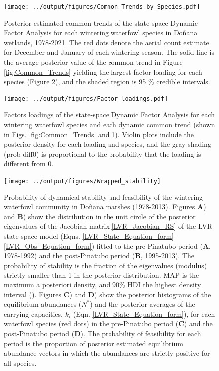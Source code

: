\documentclass[12pt]{article}
\begin{document}
	\begin{figure}[t]
		\centering
		\texttt{[image: ../output/figures/Common\_Trends\_by\_Species.pdf]}
		\caption[Posterior estimated common trends of the state-space DFA]{Posterior estimated common trends of the state-space Dynamic Factor Analysis for each wintering waterfowl species in Doñana wetlands, 1978-2021. The red dots denote the aerial count estimate for December and January of each wintering season. The solid line is the average posterior value of the common trend in Figure \ref{fig:Common_Trends} yielding the largest factor loading for each species (Figure \ref{fig:Factor_loadings}), and the shaded region is 95 \% credible intervals.}
		\label{fig:Common_Trends_by_Species}
	\end{figure}
	
	\begin{figure}[t]
		\centering
		\texttt{[image: ../output/figures/Factor\_loadings.pdf]}
		\caption[Factors loadings of the state-space DFA]{Factors loadings of the state-space Dynamic Factor Analysis for each wintering waterfowl species and each dynamic common trend (shown in Figs. \ref{fig:Common_Trends} and \ref{fig:Common_Trends_by_Species}). Violin plots include the posterior density for each loading and species, and the gray shading (prob diff0) is proportional to the probability that the loading is different from 0.}
		\label{fig:Factor_loadings}
	\end{figure}
	
	\begin{figure}[t]
		\centering
		\texttt{[image: ../output/figures/Wrapped\_stability]}
		\caption[Posterior distribution of dynamical stability and feasibility in alternative stable states]{Probability of dynamical stability and feasibility of the wintering waterfowl community in Doñana marshes (1978-2013). Figures \textbf{A}) and \textbf{B}) show the distribution in the unit circle of the posterior eigenvalues of the Jacobian matrix \ref{LVR_Jacobian_RS} of the LVR state-space model (Eqns. \ref{LVR_State_Equation_form}-\ref{LVR_Obs_Equation_form}) fitted to the pre-Pinatubo period (\textbf{A}, 1978-1992) and the post-Pinatubo period (\textbf{B}, 1995-2013). The probability of stability is the fraction of the eigenvalues (modulus) strictly smaller than 1 in the posterior distribution. MAP is the maximum a posteriori density, and 90\% HDI the highest density interval (\cite{Makowski2019}). Figures \textbf{C}) and \textbf{D}) show the posterior histograms of the equilibrium abundances ($N^*$) and the posterior averages of the carrying capacities, $k_{i}$ (Eqn. \ref{LVR_State_Equation_form}), for each waterfowl species (red dots) in the pre-Pinatubo period (\textbf{C}) and the post-Pinatubo period (\textbf{D}). The probability of feasibility for each period is the proportion of posterior estimated equilibrium abundance vectors in which the abundances are strictly positive for all species.}
		\label{fig:Wrapped_stability}
	\end{figure}
	
\end{document}
